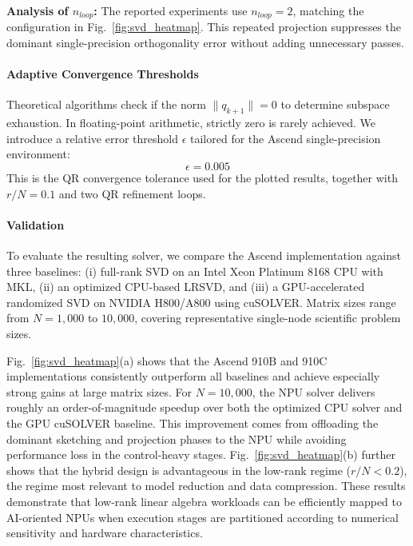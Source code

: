 \documentclass{article}
\newcommand{\rev}[1]{#1}
\begin{document}
\textbf{Analysis of $n_{loop}$:} The reported experiments use $n_{loop}=2$, matching the configuration in Fig.~\ref{fig:svd_heatmap}. This repeated projection suppresses the dominant single-precision orthogonality error without adding unnecessary passes.

\paragraph{Adaptive Convergence Thresholds}
Theoretical algorithms check if the norm $\|q_{k+1}\| = 0$ to determine subspace exhaustion. In floating-point arithmetic, strictly zero is rarely achieved. We introduce a relative error threshold $\epsilon$ tailored for the Ascend single-precision environment:
\begin{equation}
    \epsilon = 0.005
\end{equation}
This is the QR convergence tolerance used for the plotted results, together with $r/N=0.1$ and two QR refinement loops.

\paragraph{Validation}
To evaluate the resulting solver, we compare the Ascend implementation against three baselines: (i) full-rank SVD on an Intel Xeon Platinum 8168 CPU with MKL, (ii) an optimized CPU-based LRSVD, and (iii) a GPU-accelerated randomized SVD on NVIDIA \rev{H800/}A800 using cuSOLVER. Matrix sizes range from $N=1{,}000$ to $10{,}000$, covering representative single-node scientific problem sizes.

Fig.~\ref{fig:svd_heatmap}(a) shows that the Ascend 910B and 910C implementations consistently outperform all baselines and achieve especially strong gains at large matrix sizes. For $N=10{,}000$, the NPU solver delivers roughly an order-of-magnitude speedup over both the optimized CPU solver and the GPU cuSOLVER baseline. This improvement comes from offloading the dominant sketching and projection phases to the NPU while avoiding performance loss in the control-heavy stages. Fig.~\ref{fig:svd_heatmap}(b) further shows that the hybrid design is advantageous in the low-rank regime ($r/N<0.2$), the regime most relevant to model reduction and data compression. \rev{These results demonstrate that low-rank linear algebra workloads can be efficiently mapped to AI-oriented NPUs when execution stages are partitioned according to numerical sensitivity and hardware characteristics.}
\end{document}
